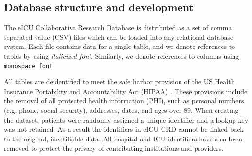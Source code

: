 \documentclass[english]{article}
\newcommand{\colname}[1]{\texttt{#1}}
\newcommand{\tblname}[1]{\emph{#1}}
\begin{document}



\subsection*{Database structure and development}\label{database-structure-and-development}

The eICU Collaborative Research Database is distributed as a set of comma separated value (CSV) files which can be loaded into any relational database system. Each file contains data for a single table, and we denote references to tables by using \tblname{italicized font}. Similarly, we denote references to columns using \colname{monospace font}.

All tables are deidentified to meet the safe harbor provision of the US Health Insurance Portability and Accountability Act (HIPAA) \cite{HIPAA}. These provisions include the removal of all protected health information (PHI), such as personal numbers (e.g. phone, social security), addresses, dates, and ages over 89. When creating the dataset, patients were randomly assigned a unique identifier and a lookup key was not retained. As a result the identifiers in eICU-CRD cannot be linked back to the original, identifiable data. All hospital and ICU identifiers have also been removed to protect the privacy of contributing institutions and providers.
\end{document}
